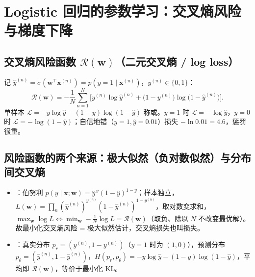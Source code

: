\section{Logistic 回归的参数学习：交叉熵风险与梯度下降}

\subsection{交叉熵风险函数 \texorpdfstring{$\mathcal R(\bm w)$}{R(w)}（二元交叉熵 / log loss）}
记 $\hat y^{(n)}=\sigma(\bm w^\top\bm x^{(n)})=p(y=1\mid\bm x^{(n)})$，$y^{(n)}\in\{0,1\}$：
\[
\mathcal R(\bm w)=-\frac1N\sum_{n=1}^N\Big[y^{(n)}\log\hat y^{(n)}+\big(1-y^{(n)}\big)\log\big(1-\hat y^{(n)}\big)\Big].
\]
单样本 $\mathcal L=-y\log\hat y-(1-y)\log(1-\hat y)$ 称或。$y=1$ 时 $\mathcal L=-\log\hat y$，$y=0$ 时 $\mathcal L=-\log(1-\hat y)$；自信地错（$y=1,\hat y=0.01$）损失 $-\ln0.01=4.6$，惩罚很重。

\subsection{风险函数的两个来源：极大似然（负对数似然）与分布间交叉熵}
\begin{itemize}
\item {}：伯努利 $p(y\mid\bm x;\bm w)=\hat y^{\,y}(1-\hat y)^{1-y}$；样本独立，$L(\bm w)=\prod_n(\hat y^{(n)})^{y^{(n)}}(1-\hat y^{(n)})^{1-y^{(n)}}$，取对数变求和，$\max_{\bm w}\log L\iff\min_{\bm w}-\frac1N\log L=\mathcal R(\bm w)$（取负、除以 $N$ 不改变最优解）。故最小化交叉熵风险 = 极大似然估计，交叉熵损失也叫损失。
\item {}：真实分布 $p_r=(y^{(n)},1-y^{(n)})$（$y=1$ 时为 $(1,0)$），预测分布 $p_\theta=(\hat y^{(n)},1-\hat y^{(n)})$，$H(p_r,p_\theta)=-y\log\hat y-(1-y)\log(1-\hat y)$，平均即 $\mathcal R(\bm w)$，等价于最小化 KL。
\end{itemize}

